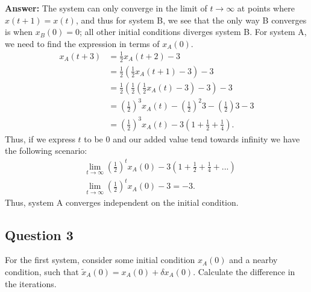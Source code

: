 \documentclass[a4paper]{article}
\newcommand{\newparagraph}{\vspace{.5cm}\noindent}
\begin{document}
\newparagraph
\textbf{Answer: }The system can only converge in the limit of $t\to\infty$ at points where $x(t + 1) = x(t)$, and thus for system {\color{red} B}, we see that the only way {\color{red} B} converges is when $x_B(0) = 0$; all other initial conditions diverges system {\color{red} B}.
For system {\color{blue} A}, we need to find the expression in terms of $x_A(0)$.
\begin{align*}
    x_A(t + 3) &= \frac{1}{2}x_A(t + 2) - 3\\
    &= \frac{1}{2}\left(\frac{1}{2}x_A(t+ 1) - 3\right) - 3\\
    &= \frac{1}{2}\left(\frac{1}{2}\left(\frac{1}{2}x_A(t) - 3\right)-3\right) - 3\\
    &= \left(\frac{1}{2}\right)^{3}x_A(t) - \left(\frac{1}{2}\right)^{2}3 - \left(\frac{1}{2}\right)3 - 3\\
    &= \left(\frac{1}{2}\right)^{3}x_A(t) - 3\left(1 + \frac{1}{2} + \frac{1}{4}\right).
\end{align*}Thus, if we express $t$ to be $0$ and our added value tend towards infinity we have the following scenario:
\begin{align*}
    &\lim_{t\to\infty} \left(\frac{1}{2}\right)^tx_A(0) - 3\left(1 + \frac{1}{2} + \frac{1}{4} + ...\right)\\
    &\lim_{t\to\infty}\left(\frac{1}{2}\right)^tx_A(0) - 3 = -3.
\end{align*}Thus, system {\color{blue}A} converges independent on the initial condition.


\subsection*{Question 3}
For the first system, consider some initial condition $x_A(0)$ and a nearby condition, such that $\tilde{x}_A(0) = x_A(0) + \delta x_A(0)$.
Calculate the difference in the iterations.
\end{document}
